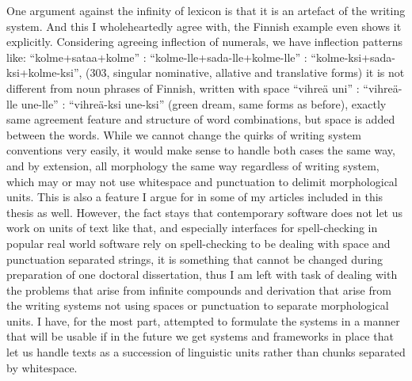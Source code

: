 \documentclass[officiallayout,final]{unihelcompling}
\begin{document}
One argument against the infinity of lexicon is that it is an artefact of the
writing system. And this I wholeheartedly agree with, the Finnish example even
shows it explicitly. Considering agreeing inflection of numerals, we have
inflection patterns like: ``kolme+sataa+kolme'' :
``kolme-lle+sada-lle+kolme-lle'' : ``kolme-ksi+sada-ksi+kolme-ksi'', (303,
singular nominative, allative and translative forms) it is not different from
noun phrases of Finnish, written with space ``vihreä uni'' : ``vihreä-lle
une-lle'' : ``vihreä-ksi une-ksi'' (green dream, same forms as before), exactly
same agreement feature and structure of word combinations, but space is added
between the words.  While we cannot change the quirks of writing system
conventions very easily, it would make sense to handle both cases the same way,
and by extension, all morphology the same way regardless of writing system,
which may or may not use whitespace and punctuation to delimit morphological
units.  This is also a feature I argue for in some of my articles included in
this thesis as well.  However, the fact stays that contemporary software does
not let us work on units of text like that, and especially interfaces for
spell-checking in popular real world software rely on spell-checking to be
dealing with space and punctuation separated strings, it is something that
cannot be changed during preparation of one doctoral dissertation, thus I am
left with task of dealing with the problems that arise from infinite compounds
and derivation that arise from the writing systems not using spaces or
punctuation to separate morphological units. I have, for the most part,
attempted to formulate the systems in a manner that will be usable if in the
future we get systems and frameworks in place that let us handle texts as a
succession of linguistic units rather than chunks separated by whitespace.
\end{document}
